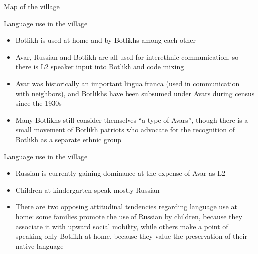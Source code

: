 \begin{frame}{Map of the village}
\begin{figure}[h]
\centering
{}
\end{figure}
\end{frame}

\begin{frame}{Language use in the village}
\begin{itemize}
    \item Botlikh is used at home and by Botlikhs among each other
    \item Avar, Russian and Botlikh are all used for interethnic communication, so there is L2 speaker input into Botlikh and code mixing
    \item Avar was historically an important lingua franca (used in communication with neighbors), and Botlikhs have been subsumed under Avars during census since the 1930s
    \item Many Botlikhs still consider themselves ``a type of Avars'', though there is a small movement of Botlikh patriots who advocate for the recognition of Botlikh as a separate ethnic group
\end{itemize}
\end{frame}
    
\begin{frame}{Language use in the village}
\begin{itemize}
    \item Russian is currently gaining dominance at the expense of Avar as L2
    \item Children at kindergarten speak mostly Russian
    \item There are two opposing attitudinal tendencies regarding language use at home: some families promote the use of Russian by children, because they associate it with upward social mobility, while others make a point of speaking only Botlikh at home, because they value the preservation of their native language
\end{itemize}
\end{frame}

